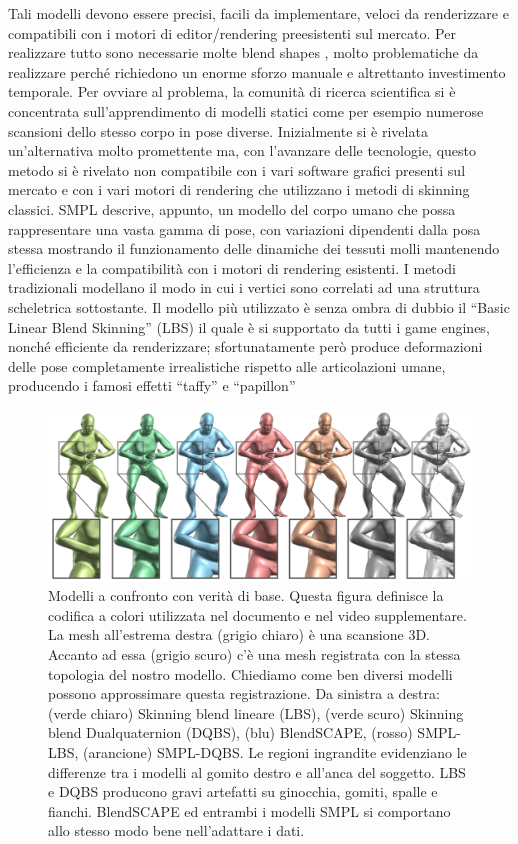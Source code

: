 \medskip

Tali modelli devono essere precisi, facili da implementare, veloci da renderizzare e compatibili con i motori di editor/rendering preesistenti sul mercato. Per realizzare tutto sono necessarie molte blend shapes , molto problematiche da realizzare perché richiedono un enorme sforzo manuale e altrettanto investimento temporale. Per ovviare al problema, la comunità di ricerca scientifica si è concentrata sull’apprendimento di modelli statici come per esempio numerose scansioni dello stesso corpo in pose diverse. Inizialmente si è rivelata un’alternativa molto promettente ma, con l’avanzare delle tecnologie, questo metodo si è rivelato non compatibile con i vari software grafici presenti sul mercato e con i vari motori di rendering che utilizzano i metodi di skinning classici.
SMPL descrive, appunto, un modello del corpo umano che possa rappresentare una vasta gamma di pose, con variazioni dipendenti dalla posa stessa mostrando il funzionamento delle dinamiche dei tessuti molli mantenendo l’efficienza e la compatibilità con i motori di rendering esistenti.
I metodi tradizionali modellano il modo in cui i vertici sono correlati ad una struttura scheletrica sottostante. Il modello più utilizzato è senza ombra di dubbio il “Basic Linear Blend Skinning” (LBS) il quale è si supportato da tutti i game engines, nonché efficiente da renderizzare; sfortunatamente però produce deformazioni delle pose completamente irrealistiche rispetto alle articolazioni umane, producendo i famosi effetti “taffy” e “papillon”

\medskip

\begin{figure}[ht!]
  \centering
  \includegraphics[scale=0.4]{Images/IntroductionPic/SMPL2.png}
  \caption{Modelli a confronto con verità di base. Questa figura definisce la codifica a colori utilizzata nel documento e nel video supplementare.
La mesh all'estrema destra (grigio chiaro) è una scansione 3D. Accanto ad essa (grigio scuro) c'è una mesh registrata con la stessa topologia del nostro modello. Chiediamo come
ben diversi modelli possono approssimare questa registrazione. Da sinistra a destra: (verde chiaro) Skinning blend lineare (LBS), (verde scuro) Skinning blend Dualquaternion (DQBS), (blu) BlendSCAPE, (rosso) SMPL-LBS, (arancione) SMPL-DQBS. Le regioni ingrandite evidenziano le differenze
tra i modelli al gomito destro e all'anca del soggetto. LBS e DQBS producono gravi artefatti su ginocchia, gomiti, spalle e fianchi.
BlendSCAPE ed entrambi i modelli SMPL si comportano allo stesso modo bene nell'adattare i dati.}
  \label{fig:SMPL2}
\end{figure}

